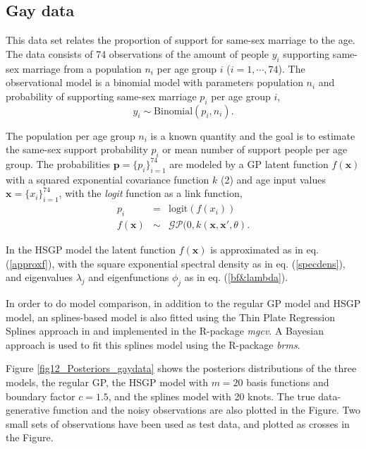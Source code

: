 \documentclass[]{interact}
\theoremstyle{plain}%
\theoremstyle{definition}
\theoremstyle{remark}
\begin{document}
\subsection{Gay data}\label{sec:gay_data}
This data set relates the proportion of support for same-sex marriage to the age. The data consists of 74 observations of the amount of people $y_i$ supporting same-sex marriage from a population $n_i$ per age group $i$ ($i=1,\cdots,74$). The observational model is a binomial model with parameters population $n_i$ and probability of supporting same-sex marriage $p_i$ per age group $i$,
%
\begin{equation*}
y_i \sim \text{Binomial}(p_i, n_i).
\end{equation*}

\noindent The population per age group $n_i$ is a known quantity and the goal is to estimate the same-sex support probability $p_i$ or mean number of support people per age group. The probabilities $\mathbf{p}=\{p_i\}_{i=1}^{74}$ are modeled by a GP latent function $f(\mathbf{x})$ with a squared exponential covariance function $k$ (2) and age input values $\mathbf{x}=\{x_i\}_{i=1}^{74}$, with the {\it logit} function as a link function,
%
\begin{eqnarray*} \label{eq:gpprior_gay}
p_i &=& \text{logit}(f(x_i)) \nonumber \\
f(\mathbf{x}) &\sim& \mathcal{GP}(0, k(\mathbf{x},\mathbf{x}', \theta).
\end{eqnarray*}

In the HSGP model the latent function $f(\mathbf{x})$ is approximated as in eq. (\ref{approxf}), with the square exponential spectral density as in eq. (\ref{specdens}), and eigenvalues $\lambda_j$ and eigenfunctions $\phi_j$ as in eq. (\ref{bf&lambda}). 

In order to do model comparison, in addition to the regular GP model and HSGP model, an splines-based model is also fitted using the Thin Plate Regression Splines approach in \cite{wood2003thin} and implemented in the R-package \textit{mgcv}. A Bayesian approach is used to fit this splines model using the R-package \textit{brms}.

Figure \ref{fig12_Posteriors_gaydata} shows the posteriors distributions of the three models, the regular GP, the HSGP model with $m=20$ basis functions and boundary factor $c=1.5$, and the splines model with 20 knots. The true data-generative function and the noisy observations are also plotted in the Figure. Two small sets of observations have been used as test data, and plotted as crosses in the Figure.
\end{document}
